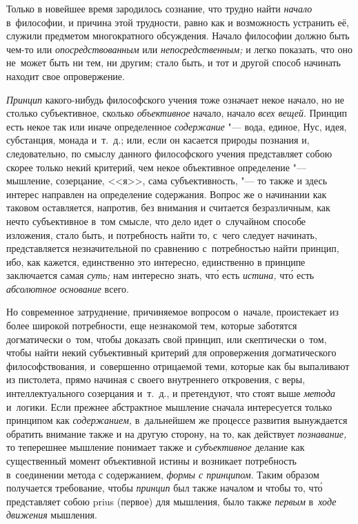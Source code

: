Только в новейшее время зародилось сознание, что трудно найти {\em начало}
в~философии, и причина этой трудности,
равно как и возможность устранить её, служили предметом
многократного обсуждения. Начало философии должно быть чем-то или {\em
опосредствованным} или {\em непосредственным;} и легко показать, что оно
не~может быть ни тем, ни другим; стало быть, и тот и другой способ начинать
находит свое опровержение.

{\em Принцип} какого-нибудь философского учения тоже означает некое начало, но
не столько субъективное, сколько {\em объективное} начало, начало
{\em всех вещей}. Принцип есть некое так или иначе определенное
{\em содержание} "--- вода, единое, Нус, идея, субстанция,
монада и~т.~д.; или, если он касается природы познания и, следовательно, по
смыслу данного философского учения представляет собою скорее только некий
критерий, чем некое объективное определение "--- мышление, созерцание, <<я>>,
сама субъективность, "--- то также и здесь интерес направлен на определение
содержания. Вопрос же о начинании как таковом оставляется, напротив, без
внимания и считается безразличным, как нечто субъективное в~том смысле, что
дело идет о~случайном способе изложения, стало быть, и потребность найти то,
с~чего следует начинать, представляется незначительной по сравнению
с~потребностью найти принцип, ибо, как кажется, единственно это интересно,
единственно в принципе заключается самая {\em суть;} нам интересно знать,
чт\'{о} есть {\em истина,} чт\'{о} есть {\em абсолютное основание} всего.

Но современное затруднение, причиняемое вопросом о~начале, проистекает из более
широкой потребности, еще незнакомой тем, которые заботятся догматически о~том,
чтобы доказать свой принцип, или скептически о~том, чтобы найти некий
субъективный критерий для опровержения догматического философствования,
и~совершенно отрицаемой теми, которые как бы выпаливают из пистолета, прямо
начиная с своего внутреннего откровения, с веры, интеллектуального созерцания
и~т.~д., и претендуют, что стоят выше {\em метода} и~логики. Если прежнее
абстрактное мышление сначала интересуется только принципом как
{\em содержанием,} в~дальнейшем же процессе развития вынуждается обратить
внимание также и на другую сторону, на то, как действует {\em познавание,}
то теперешнее мышление понимает также и {\em субъективное} делание как
существенный момент объективной истины и возникает потребность в~соединении
метода с содержанием, {\em формы с принципом}. Таким образом получается
требование, чтобы {\em принцип} был также началом и чтобы то, чт\'{о}
представляет собою prius (первое) для мышления, было также {\em первым}
в~{\em ходе движения} мышления.

